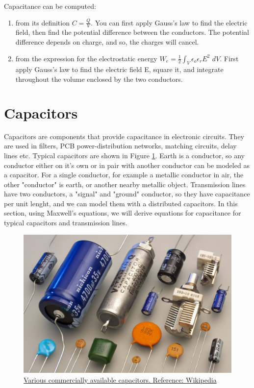 \documentclass{ximera}
\begin{document}
Capacitance can be computed:

\begin{enumerate}
\item from its definition $C=\frac{Q}{V}$. You can first apply Gauss's law to find the electric field, then find the potential difference between the conductors. The potential difference depends on charge, and so, the charges will cancel.
\item from the expression for the electrostatic energy $W_e=\frac{1}{2} \int_V  \epsilon_o \epsilon_r E^2 \, \,dV$. First apply Gauss's law to find the electric field E, square it, and integrate throughout the volume enclosed by the two conductors. 
\end{enumerate}


\section{Capacitors}

Capacitors are components that provide capacitance in electronic circuits. They are used in filters, PCB power-distribution networks, matching circuits, delay lines etc. Typical capacitors are shown in Figure \ref{fig:capacitors}. Earth is a conductor, so any conductor either on it's own or in pair with another conductor can be modeled as a capacitor. For a single conductor, for example a metallic conductor in air, the other "conductor" is earth, or another nearby metallic object. Transmission lines have two conductors, a "signal" and "ground" conductor, so they have capacitance per unit lenght, and we can model them with a distributed capacitors. In this section, using Maxwell's equations, we will derive equations for capacitance for typical capacitors and transmission lines.


\begin{figure}[htbp]
\begin{center}
\includegraphics[scale=0.8]{../jpg/capacitors.jpg}
\end{center}
\caption{\href{https://en.wikipedia.org/wiki/Capacitor}{Various commercially available capacitors. Reference: Wikipedia}}\label{fig:capacitors}
\end{figure}
\end{document}
